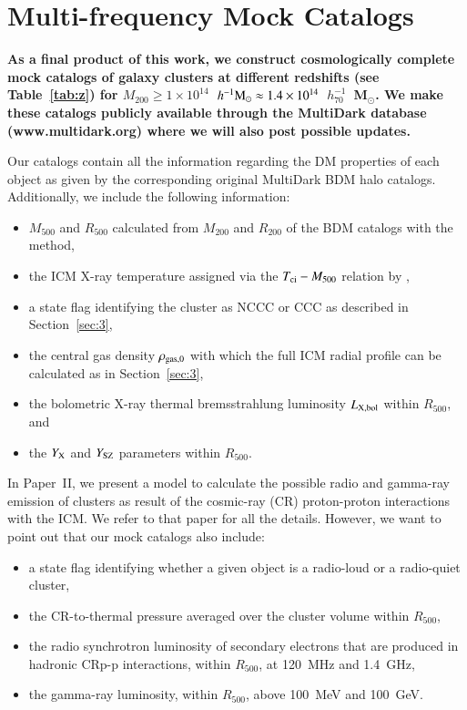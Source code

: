 \documentclass[useAMS,usenatbib]{mn2e}
\begin{document}
\section{Multi-frequency Mock Catalogs}
\label{sec:6}

{\bf As a final product of this work, we construct cosmologically complete mock
  catalogs of galaxy clusters at different redshifts (see Table~\ref{tab:z}) for
  $M_{200}\geq1\times10^{14}$~$h^{-1}{\mathrm{M}}_{\odot}
  \approx1.4\times10^{14}$~$h_{70}^{-1}$~M$_{\odot}$.  We make these catalogs
  publicly available through the MultiDark database (www.multidark.org) where we
  will also post possible updates.

  Our catalogs contain all the information regarding the DM properties of each
  object as given by the corresponding original MultiDark BDM halo
  catalogs. Additionally, we include the following information:

\begin{itemize}
\item $M_{500}$ and $R_{500}$ calculated from $M_{200}$ and $R_{200}$ of the BDM catalogs with the \cite{2003ApJ...584..702H} method,
\item the ICM X-ray temperature assigned via the $T_{{\mathrm{ci}}}-M_{500}$ relation by \cite{2010MNRAS.406.1773M},
\item a state flag identifying the cluster as NCCC or CCC as described in Section~\ref{sec:3},
\item the central gas density $\rho_{{\mathrm{gas}},0}$ with which the full ICM radial profile can be calculated as in Section~\ref{sec:3},
\item the bolometric X-ray thermal bremsstrahlung luminosity $L_{{\mathrm{X, bol}}}$
  within $R_{500}$, and
\item the $Y_{{\mathrm{X}}}$ and $Y_{{\mathrm{SZ}}}$ parameters within $R_{500}$.
\end{itemize}

In Paper~II, we present a model to calculate the possible radio and gamma-ray
emission of clusters as result of the cosmic-ray (CR) proton-proton interactions
with the ICM. We refer to that paper for all the details. However, we want to
point out that our mock catalogs also include:

\begin{itemize}
\item a state flag identifying whether a given object is a radio-loud or a radio-quiet cluster, 
\item the CR-to-thermal pressure averaged over the cluster volume within $R_{500}$,
\item the radio synchrotron luminosity of secondary electrons that are produced
  in hadronic CRp-p interactions, within $R_{500}$, at 120~MHz and 1.4~GHz,
\item the gamma-ray luminosity, within $R_{500}$, above 100~MeV and 100~GeV.
\end{itemize}

}
\end{document}
